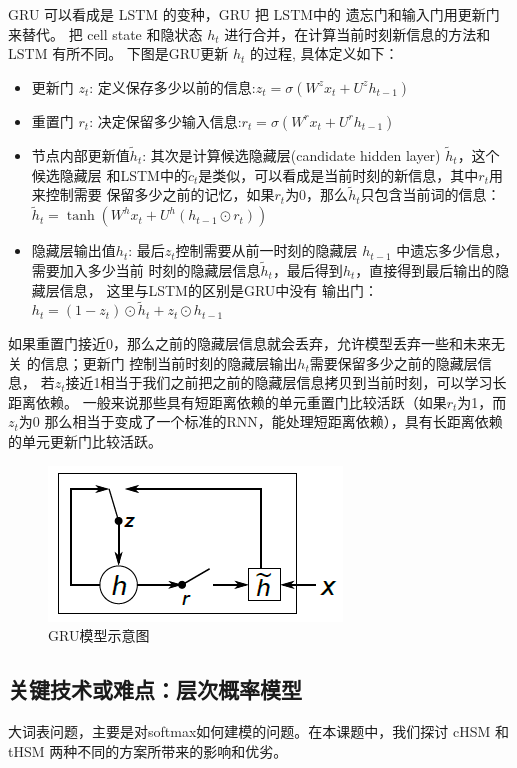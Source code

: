 \documentclass[twoside,UTF8,AutoFakeBold]{buaathesis}
\begin{document}
GRU 可以看成是 LSTM 的变种，GRU 把 LSTM中的 遗忘门和输入门用更新门来替代。 把 cell state 和隐状态 $h_t$ 进行合并，在计算当前时刻新信息的方法和 LSTM 有所不同。 下图是GRU更新 $h_t$ 的过程\cite{DBLP:journals/corr/Pezeshki15}, 具体定义如下：
\begin{itemize}
\item 更新门 $z_t$: 定义保存多少以前的信息:$z_t = \sigma ( W^z x_t+ U^z h_{t-1}  )$

\item 重置门 $r_t$: 决定保留多少输入信息:$r_t = \sigma(W^r x_t  + U^r h_{t-1}  )$

\item 节点内部更新值$\tilde h_t $: 其次是计算候选隐藏层(candidate hidden layer) $\tilde h_t$，这个候选隐藏层 和LSTM中的$\tilde c_t$是类似，可以看成是当前时刻的新信息，其中$r_t$用来控制需要 保留多少之前的记忆，如果$r_t$为0，那么$\tilde h_t$只包含当前词的信息：$\tilde h_t  = \tanh (W^h x_t  + U^h(h_{t-1} \odot r_t) )$

\item 隐藏层输出值$h_t$: 最后$z_t$控制需要从前一时刻的隐藏层 $h_{t-1}$ 中遗忘多少信息，需要加入多少当前 时刻的隐藏层信息$\tilde h_t$，最后得到$h_t$，直接得到最后输出的隐藏层信息， 这里与LSTM的区别是GRU中没有 输出门：$h_t = (1-z_t)\odot \tilde h_t  + z_t \odot h_{t-1}$
\end{itemize}
如果重置门接近0，那么之前的隐藏层信息就会丢弃，允许模型丢弃一些和未来无关 的信息；更新门 控制当前时刻的隐藏层输出$h_t$需要保留多少之前的隐藏层信息， 若$z_t$接近1相当于我们之前把之前的隐藏层信息拷贝到当前时刻，可以学习长距离依赖。 一般来说那些具有短距离依赖的单元重置门比较活跃（如果$r_t$为1，而$z_t$为$0$ 那么相当于变成了一个标准的RNN，能处理短距离依赖），具有长距离依赖的单元更新门比较活跃。

\begin{figure}
  \centering
  \includegraphics[width=0.5\linewidth]{./figures/gru}
  \caption{GRU模型示意图}\label{fig:gru}
\end{figure}


\subsection{关键技术或难点：层次概率模型}
大词表问题，主要是对softmax如何建模的问题。在本课题中，我们探讨 cHSM 和 tHSM 两种不同的方案所带来的影响和优劣。
\end{document}
